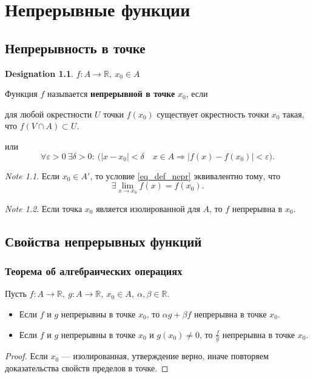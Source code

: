 \documentclass[11pt]{book}
\newcommand{\R}{\mathbb{R}}
\theoremstyle{definition}
\theoremstyle{plain}
\theoremstyle{plain}
\theoremstyle{definition}
\newtheorem*{name}{Designation}
\theoremstyle{remark}
\newtheorem*{note}{Note}
\begin{document}
\chapter{Непрерывные функции}
\section{Непрерывность в точке}
\begin{name}
    $ f: A \to  \R, ~ x_0 \in  A$
\end{name}
\begin{defn}
    Функция $ f$ называется {\bf непрерывной в точке} $ x_0$, если
    \begin{description}
	\item
	    для любой окрестности $ U$ точки  $ f(x_0)$ существует окрестность точки $ x_0$ такая, что $ f(V \cap A) \subset U$.
	\item или
	    \begin{equation}\label{eq_def_nepr}
		\forall \varepsilon >0 ~ \exists \delta >0: ~ \bigl( |x-x_0| < \delta \quad x \in A \Longrightarrow  |f(x) - f(x_0)| < \varepsilon \bigr).
	    \end{equation}
    \end{description}
\end{defn}
\begin{note}
    Если  $ x_0 \in A'$, то условие \ref{eq_def_nepr} эквивалентно тому, что \[
	\exists \lim_{x \to  x_0} f(x) = f(x_0)
    .\]
\end{note}
\begin{note}
    Если точка $ x_0$ является изолированной для $ A$, то  $ f$ непрерывна в $ x_0$.
\end{note}
\section{Свойства непрерывных функций}
\subsection{Теорема об алгебраических операциях}
\begin{thm}
    Пусть $ f: A \to  \R, ~ g : A \to \R, ~ x_0 \in A, ~ \alpha , \beta \in \R$.
    \begin{itemize}
	\item Если $ f$ и  $ g$ непрерывны в точке  $ x_0$, то $ \alpha g + \beta f$ непрерывна в точке $ x_0$.
	\item     Если $ f$ и  $ g$ непрерывны в точке  $ x_0$ и $ g(x_0) \ne 0$, то $\frac{f}{g}$ непрерывна в точке $ x_0$.
    \end{itemize}
\end{thm}
\begin{proof}
    Если $ x_0$ --- изолированная, утверждение верно, иначе повторяем доказательства свойств пределов в точке.
\end{proof}
\end{document}

